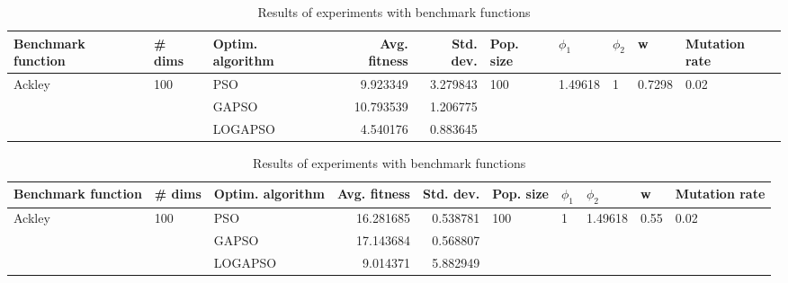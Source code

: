 \documentclass{article}
\begin{document}
\begin{table}
\centering
\caption{Results of experiments with benchmark functions}
\begin{tabular}{lllrrlllll}
\toprule
     Benchmark function &              \# dims & Optim. algorithm &  Avg. fitness &  Std. dev. &            Pop. size &               $\phi_{1}$ &         $\phi_{2}$ &                       w &         Mutation rate \\
\midrule
\multirow{3}{*}{Ackley} & \multirow{3}{*}{100} &              PSO &      9.923349 &   3.279843 & \multirow{3}{*}{100} & \multirow{3}{*}{1.49618} & \multirow{3}{*}{1} & \multirow{3}{*}{0.7298} & \multirow{3}{*}{0.02} \\
                        &                      &            GAPSO &     10.793539 &   1.206775 &                      &                          &                    &                         &                       \\
                        &                      &          LOGAPSO &      4.540176 &   0.883645 &                      &                          &                    &                         &                       \\
\bottomrule
\end{tabular}
\end{table}
\begin{table}
\centering
\caption{Results of experiments with benchmark functions}
\begin{tabular}{lllrrlllll}
\toprule
     Benchmark function &              \# dims & Optim. algorithm &  Avg. fitness &  Std. dev. &            Pop. size &         $\phi_{1}$ &               $\phi_{2}$ &                     w &         Mutation rate \\
\midrule
\multirow{3}{*}{Ackley} & \multirow{3}{*}{100} &              PSO &     16.281685 &   0.538781 & \multirow{3}{*}{100} & \multirow{3}{*}{1} & \multirow{3}{*}{1.49618} & \multirow{3}{*}{0.55} & \multirow{3}{*}{0.02} \\
                        &                      &            GAPSO &     17.143684 &   0.568807 &                      &                    &                          &                       &                       \\
                        &                      &          LOGAPSO &      9.014371 &   5.882949 &                      &                    &                          &                       &                       \\
\bottomrule
\end{tabular}
\end{table}
\end{document}
